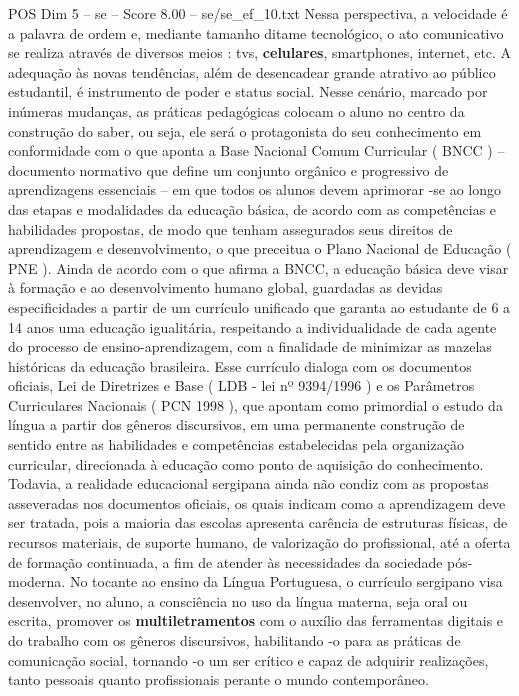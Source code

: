 \begin{textsample}{POS Dim 5 – se – Score 8.00 – se/se\_ef\_10.txt}
Nessa perspectiva, a velocidade é a palavra de ordem e, mediante tamanho ditame tecnológico, o ato comunicativo se realiza através de diversos meios : tvs, \textbf{celulares}, smartphones, internet, etc.
A adequação às novas tendências, além de desencadear grande atrativo ao público estudantil, é instrumento de poder e status social.
Nesse cenário, marcado por inúmeras mudanças, as práticas pedagógicas colocam o aluno no centro da construção do saber, ou seja, ele será o protagonista do seu conhecimento em conformidade com o que aponta a Base Nacional Comum Curricular ( BNCC ) – documento normativo que define um conjunto orgânico e progressivo de aprendizagens essenciais – em que todos os alunos devem aprimorar -se ao longo das etapas e modalidades da educação básica, de acordo com as competências e habilidades propostas, de modo que tenham assegurados seus direitos de aprendizagem e desenvolvimento, o que preceitua o Plano Nacional de Educação ( PNE ).
Ainda de acordo com o que afirma a BNCC, a educação básica deve visar à formação e ao desenvolvimento humano global, guardadas as devidas especificidades a partir de um currículo unificado que garanta ao estudante de 6 a 14 anos uma educação igualitária, respeitando a individualidade de cada agente do processo de ensino-aprendizagem, com a finalidade de minimizar as mazelas históricas da educação brasileira.
Esse currículo dialoga com os documentos oficiais, Lei de Diretrizes e Base ( LDB - lei nº 9394/1996 ) e os Parâmetros Curriculares Nacionais ( PCN 1998 ), que apontam como primordial o estudo da língua a partir dos gêneros discursivos, em uma permanente construção de sentido entre as habilidades e competências estabelecidas pela organização curricular, direcionada à educação como ponto de aquisição do conhecimento.
Todavia, a realidade educacional sergipana ainda não condiz com as propostas asseveradas nos documentos oficiais, os quais indicam como a aprendizagem deve ser tratada, pois a maioria das escolas apresenta carência de estruturas físicas, de recursos materiais, de suporte humano, de valorização do profissional, até a oferta de formação continuada, a fim de atender às necessidades da sociedade pós-moderna.
No tocante ao ensino da Língua Portuguesa, o currículo sergipano visa desenvolver, no aluno, a consciência no uso da língua materna, seja oral ou escrita, promover os \textbf{multiletramentos} com o auxílio das ferramentas digitais e do trabalho com os gêneros discursivos, habilitando -o para as práticas de comunicação social, tornando -o um ser crítico e capaz de adquirir realizações, tanto pessoais quanto profissionais perante o mundo contemporâneo.

\end{textsample}
